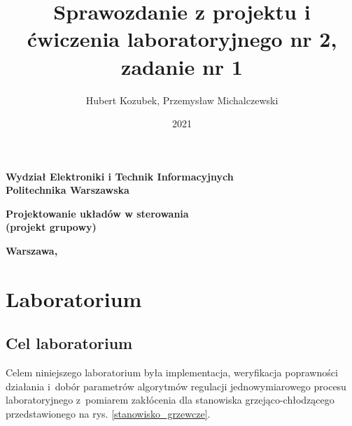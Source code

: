 \documentclass[a4paper,titlepage,11pt,twosides,floatssmall]{mwrep}
\begin{document}
\frenchspacing
\pagestyle{uheadings}

\title{\bf Sprawozdanie z projektu i ćwiczenia laboratoryjnego nr 2, zadanie nr 1\vskip 0.1cm}
\author{Hubert Kozubek, Przemysław Michalczewski}
\date{2021}

\makeatletter
\renewcommand{\maketitle}{\begin{titlepage}
\begin{center}{\LARGE {\bf
Wydział Elektroniki i Technik Informacyjnych}}\\
\vspace{0.4cm}
{\LARGE {\bf Politechnika Warszawska}}\\
\vspace{0.3cm}
\end{center}
\vspace{5cm}
\begin{center}
{\bf \LARGE Projektowanie układów w sterowania\\ (projekt grupowy) \vskip 0.1cm}
\end{center}
\vspace{1cm}
\begin{center}
{\bf \LARGE \@title}
\end{center}
\vspace{2cm}
\begin{center}
{\bf \Large \@author \par}
\end{center}
\vspace*{\stretch{6}}
\begin{center}
\bf{\large{Warszawa, \@date\vskip 0.1cm}}
\end{center}
\end{titlepage}
}
\makeatother

\maketitle

\tableofcontents

\chapter{Laboratorium}
\section{Cel laboratorium}
Celem niniejszego laboratorium była implementacja, weryfikacja poprawności działania i~dobór parametrów algorytmów regulacji jednowymiarowego procesu laboratoryjnego z~pomiarem zakłócenia dla stanowiska grzejąco-chłodzącego przedstawionego na rys. \ref{stanowisko_grzewcze}.
\end{document}
